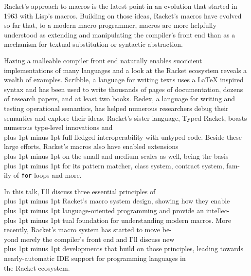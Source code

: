 \documentclass[runningheads]{llncs}
\newcommand{\MoreSpace}{\spaceskip 4pt plus 1pt minus 1pt}
\newcommand{\LittleMoreSpace}{\spaceskip 3pt plus 1pt minus 1pt}
\newcommand{\LessSpace}{\spaceskip 1.5pt plus 1pt minus 1pt}
\begin{document}
Racket's approach to macros is the latest point in an evolution that
started in 1963 with Lisp's macros. Building on those ideas, Racket's
macros have evolved so far that, to a modern macro programmer, macros
are more helpfully understood as extending and manipulating the
compiler's front end than as a mechanism for textual substitution or
syntactic abstraction.

Having a malleable compiler front end naturally enables succicient
implementations of many languages and a look at the Racket ecosystem
reveals a wealth of examples. Scribble, a language for writing texts
uses a \LaTeX{} inspired syntax and has been used to write thousands of
pages of documentation, dozens of research papers, and at least two
books. Redex, a language for writing and testing operational
semantics, has helped numerous researchers debug their semantics and
explore their ideas. Racket's sister-language, Typed Racket, boasts
numerous type-level innovations and\\
%
{\MoreSpace{} full-fledged interoperability with untyped code. Beside these}\\
%
large efforts, Racket's macros also have enabled extensions\\
%
{\LittleMoreSpace{} on the small and medium scales as well, being the basis}\\
%
{\LessSpace{} for its pattern matcher, class system, contract system, fam-} \\
%
ily of \texttt{for} loops and more.

In this talk, I'll discuss three essential principles of\\
%
{\LessSpace{} Racket's macro system design, showing how they enable}\\
%
{\LessSpace{} language-oriented programming and provide an intellec-}\\
%
{\LessSpace{} tual foundation for understanding modern macros. More}\\
%
recently, Racket's macro system has started to move be-\\
%
yond merely the compiler's front end and I'll discuss new\\
%
{\LessSpace{} developments that build on those principles, leading towards}\\
%
nearly-automatic IDE support for programming languages in\\ 
% 
the Racket ecosystem.
\end{document}
